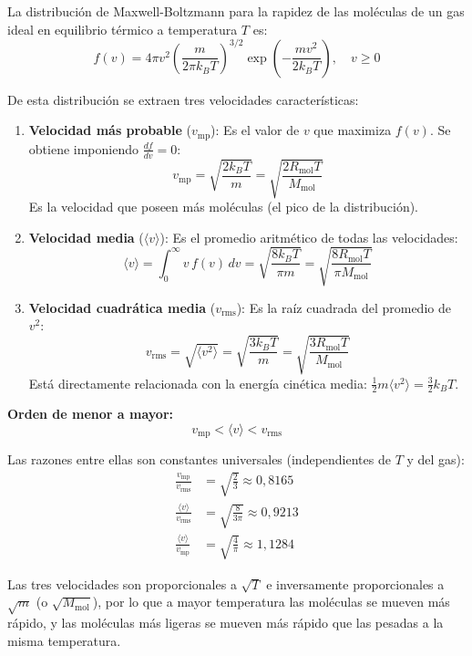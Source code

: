 \documentclass[a4paper]{article}
\begin{document}
La distribución de Maxwell-Boltzmann para la rapidez de las moléculas de un gas ideal en equilibrio térmico a temperatura $T$ es:
$$
f(v) = 4\pi v^2 \left(\frac{m}{2\pi k_B T}\right)^{3/2} \exp\left(-\frac{mv^2}{2k_B T}\right), \quad v \geq 0
$$

De esta distribución se extraen tres velocidades características:

\begin{enumerate}
    \item \textbf{Velocidad más probable} ($v_{\text{mp}}$): Es el valor de $v$ que maximiza $f(v)$. Se obtiene imponiendo $\frac{df}{dv} = 0$:
$$
v_{\text{mp}} = \sqrt{\frac{2k_B T}{m}} = \sqrt{\frac{2R_{\text{mol}} T}{M_{\text{mol}}}}
$$
Es la velocidad que poseen más moléculas (el pico de la distribución).

    \item \textbf{Velocidad media} ($\langle v \rangle$): Es el promedio aritmético de todas las velocidades:
$$
\langle v \rangle = \int_0^\infty v\, f(v)\, dv = \sqrt{\frac{8k_B T}{\pi m}} = \sqrt{\frac{8R_{\text{mol}} T}{\pi M_{\text{mol}}}}
$$

    \item \textbf{Velocidad cuadrática media} ($v_{\text{rms}}$): Es la raíz cuadrada del promedio de $v^2$:
$$
v_{\text{rms}} = \sqrt{\langle v^2 \rangle} = \sqrt{\frac{3k_B T}{m}} = \sqrt{\frac{3R_{\text{mol}} T}{M_{\text{mol}}}}
$$
Está directamente relacionada con la energía cinética media: $\frac{1}{2}m\langle v^2 \rangle = \frac{3}{2}k_B T$.
\end{enumerate}

\textbf{Orden de menor a mayor:}
$$
\boxed{v_{\text{mp}} < \langle v \rangle < v_{\text{rms}}}
$$

Las razones entre ellas son constantes universales (independientes de $T$ y del gas):
\begin{align*}
\frac{v_{\text{mp}}}{v_{\text{rms}}} &= \sqrt{\frac{2}{3}} \approx 0{,}8165 \\[6pt]
\frac{\langle v \rangle}{v_{\text{rms}}} &= \sqrt{\frac{8}{3\pi}} \approx 0{,}9213 \\[6pt]
\frac{\langle v \rangle}{v_{\text{mp}}} &= \sqrt{\frac{4}{\pi}} \approx 1{,}1284
\end{align*}

Las tres velocidades son proporcionales a $\sqrt{T}$ e inversamente proporcionales a $\sqrt{m}$ (o $\sqrt{M_{\text{mol}}}$), por lo que a mayor temperatura las moléculas se mueven más rápido, y las moléculas más ligeras se mueven más rápido que las pesadas a la misma temperatura.
\end{document}

